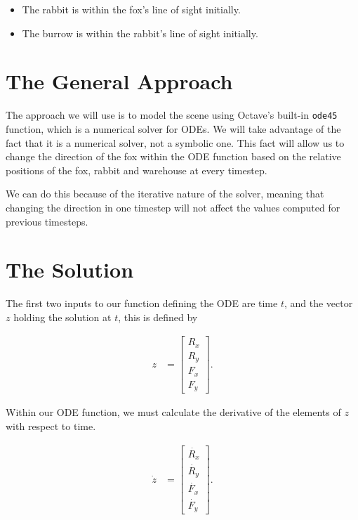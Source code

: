 \begin{itemize}

\item The rabbit is within the fox's line of sight initially.
\item The burrow is within the rabbit's line of sight initially.

\end{itemize}



\section{The General Approach}

The approach we will use is to model the scene using Octave's built-in \texttt{ode45} function, which is a numerical solver for ODEs. We will take advantage of the fact that it is a numerical solver, not a symbolic one. This fact will allow us to change the direction of the fox within the ODE function based on the relative positions of the fox, rabbit and warehouse at every timestep. 

We can do this because of the iterative nature of the solver, meaning that changing the direction in one timestep will not affect the values computed for previous timesteps.

\section {The Solution}

The first two inputs to our function defining the ODE are time $t$, and the vector $z$ holding the solution at $t$, this is defined by

\begin{align}\nonumber
    z &= \begin{bmatrix}
           R_x \\
           R_y \\
           F_x \\
           F_y
         \end{bmatrix}.
  \end{align}

Within our ODE function, we must calculate the derivative of the elements of $z$ with respect to time. 

\begin{align}\nonumber
    \dot{z} &= \begin{bmatrix}
            \dot{R_x} \\
            \dot{R_y} \\
            \dot{F_x} \\
            \dot{F_y}
         \end{bmatrix}.
  \end{align}
 
